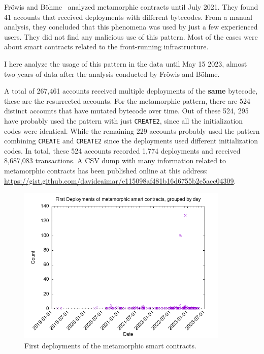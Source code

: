 Fröwis and Böhme~\cite{create2-metamorphic} analyzed metamorphic contracts until July 2021. They found 41 accounts that received deployments with different bytecodes. From a manual analysis, they concluded that this phenomena was used by just a few experienced users. They did not find any malicious use of this pattern. Most of the cases were about smart contracts related to the front-running infrastructure.

I here analyze the usage of this pattern in the data until May 15 2023, almost two years of data after the analysis conducted by Fröwis and Böhme.

A total of 267,461 accounts received multiple deployments of the \textbf{same} bytecode, these are the resurrected accounts. For the metamorphic pattern, there are 524 distinct accounts that have mutated bytecode over time. Out of these 524, 295 have probably used the pattern with just {\tt CREATE2}, since all the initialization codes were identical. While the remaining 229 accounts probably used the pattern combining {\tt CREATE} and {\tt CREATE2} since the deployments used different initialization codes. In total, these 524 accounts recorded 1,774 deployments and received 8,687,083 transactions. A CSV dump with many information related to metamorphic contracts has been published online at this address: \url{https://gist.github.com/davideaimar/e115098af481b16d6755b2e5acc04309}.

\begin{figure}
    \centering
    \includegraphics[width=0.9\textwidth]{Figures/analysis/metamorphic-first_deploys_outliers.png}
    \caption{First deployments of the metamorphic smart contracts.}
    \label{fig:meta-deploys-1}
\end{figure}


